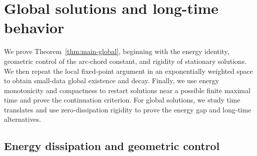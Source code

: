 \documentclass[11pt,reqno]{amsart}
\theoremstyle{plain}
\theoremstyle{definition}
\numberwithin{equation}{section}
\begin{document}
\section{Global solutions and long-time behavior}
\label{sec:global-theory}
We prove Theorem~\ref{thm:main-global}, beginning with the energy identity,
geometric control of the arc-chord constant, and rigidity of stationary
solutions. We then repeat the local fixed-point argument in an exponentially
weighted space to obtain small-data global existence and decay.
Finally, we use energy monotonicity and compactness to restart solutions
near a possible finite maximal time and prove the continuation criterion.
For global solutions, we study time translates and use zero-dissipation
rigidity to prove the energy gap and long-time alternatives.

\subsection{Energy dissipation and geometric control}
\label{subsec:energy-geometry}
\end{document}
